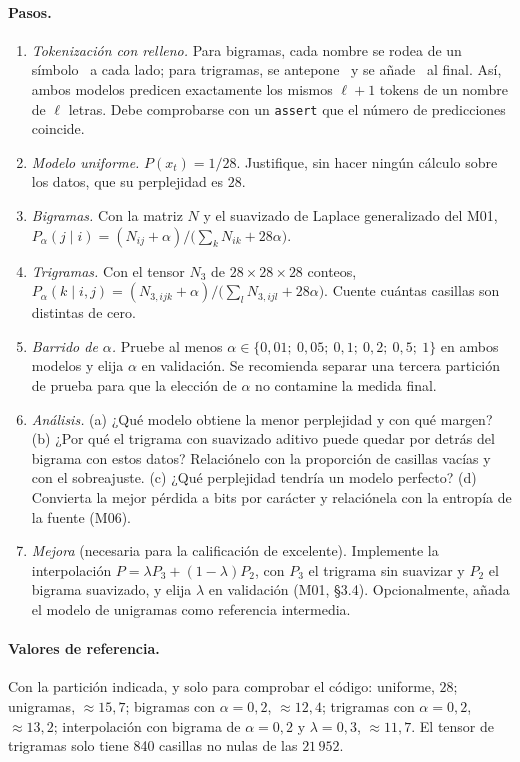 \paragraph{Pasos.}
\begin{enumerate}[label=\arabic*.]
  \item \emph{Tokenización con relleno.} Para bigramas, cada nombre se rodea de un símbolo \fin\ a cada lado; para trigramas, se antepone \fin\fin\ y se añade \fin\ al final. Así, ambos modelos predicen exactamente los mismos $\ell+1$ tokens de un nombre de $\ell$ letras. Debe comprobarse con un \texttt{assert} que el número de predicciones coincide.
  \item \emph{Modelo uniforme.} $P(x_t)=1/28$. Justifique, sin hacer ningún cálculo sobre los datos, que su perplejidad es $28$.
  \item \emph{Bigramas.} Con la matriz $N$ y el suavizado de Laplace generalizado del M01, $P_\alpha(j\mid i)=(N_{ij}+\alpha)/\big(\sum_k N_{ik}+28\alpha\big)$.
  \item \emph{Trigramas.} Con el tensor $N_3$ de $28\times 28\times 28$ conteos, $P_\alpha(k\mid i,j)=(N_{3,ijk}+\alpha)/\big(\sum_l N_{3,ijl}+28\alpha\big)$. Cuente cuántas casillas son distintas de cero.
  \item \emph{Barrido de $\alpha$.} Pruebe al menos $\alpha\in\{0{,}01;\ 0{,}05;\ 0{,}1;\ 0{,}2;\ 0{,}5;\ 1\}$ en ambos modelos y elija $\alpha$ en validación. Se recomienda separar una tercera partición de prueba para que la elección de $\alpha$ no contamine la medida final.
  \item \emph{Análisis.} (a) ¿Qué modelo obtiene la menor perplejidad y con qué margen? (b) ¿Por qué el trigrama con suavizado aditivo puede quedar por detrás del bigrama con estos datos? Relaciónelo con la proporción de casillas vacías y con el sobreajuste. (c) ¿Qué perplejidad tendría un modelo perfecto? (d) Convierta la mejor pérdida a bits por carácter y relaciónela con la entropía de la fuente (M06).
  \item \emph{Mejora} (necesaria para la calificación de excelente). Implemente la interpolación $P=\lambda P_3+(1-\lambda)P_2$, con $P_3$ el trigrama sin suavizar y $P_2$ el bigrama suavizado, y elija $\lambda$ en validación (M01, §3.4). Opcionalmente, añada el modelo de unigramas como referencia intermedia.
\end{enumerate}

\paragraph{Valores de referencia.} Con la partición indicada, y solo para comprobar el código: uniforme, $28$; unigramas, $\approx 15{,}7$; bigramas con $\alpha=0{,}2$, $\approx 12{,}4$; trigramas con $\alpha=0{,}2$, $\approx 13{,}2$; interpolación con bigrama de $\alpha=0{,}2$ y $\lambda=0{,}3$, $\approx 11{,}7$. El tensor de trigramas solo tiene 840 casillas no nulas de las $21\,952$.

